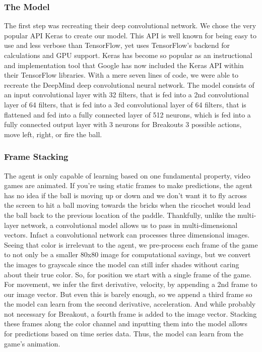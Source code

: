 \documentclass[%
 aip,
 jmp,%
 amsmath,amssymb,
 reprint,%
]{revtex4-1}
\begin{document}
\subsubsection{The Model}
The first step was recreating their deep convolutional network. We chose the very popular API Keras to create our model. This API is well known for being easy to use and less verbose than TensorFlow, yet uses TensorFlow’s backend for calculations and GPU support. Keras has become so popular as an instructional and implementation tool that Google has now included the Keras API within their TensorFlow libraries. With a mere seven lines of code, we were able to recreate the DeepMind deep convolutional neural network. The model consists of an input convolutional layer with 32 filters, that is fed into a 2nd convolutional layer of 64 filters, that is fed into a 3rd convolutional layer of 64 filters, that is flattened and fed into a fully connected layer of 512 neurons, which is fed into a fully connected output layer with 3 neurons for Breakouts 3 possible actions, move left, right, or fire the ball.

\subsubsection{Frame Stacking}
The agent is only capable of learning based on one fundamental property, video games are animated. If you're using static frames to make predictions, the agent has no idea if the ball is moving up or down and we don't want it to fly across the screen to hit a ball moving towards the bricks when the ricochet would lead the ball back to the previous location of the paddle. Thankfully, unlike the multi-layer network, a convolutional model allows us to pass in multi-dimensional vectors. Infact a convolutional network can processes three dimensional images. Seeing that color is irrelevant to the agent, we pre-process each frame of the game to not only be a smaller 80x80 image for computational savings, but we convert the images to grayscale since the model can still infer shades without caring about their true color. So, for position we start with a single frame of the game. For movement, we infer the first derivative, velocity, by appending a 2nd frame to our image vector. But even this is barely enough, so we append a third frame so the model can learn from the second derivative, acceleration. And while probably not necessary for Breakout, a fourth frame is added to the image vector. Stacking these frames along the color channel and inputting them into the model allows for predictions based on time series data. Thus, the model can learn from the game's animation.
\end{document}
